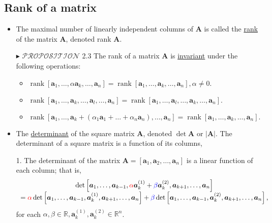 \documentclass[12pt,thmsa]{article}
\begin{document}
\subsection{Rank of a matrix}
\begin{itemize}
	\item The maximal number of linearly independent columns of \(\boldsymbol{A}\) is called the \underline{rank} of the matrix \(\boldsymbol{A}\), denoted rank \(\boldsymbol{A}\).
	
	\item[\(\blacktriangleright\)] \(\mathscr{PROPOSITION}\) 2.3 The rank of a matrix \(\boldsymbol{A}\) is \underline{invariant} under the following operations:
	
	\begin{itemize}
		\item \(\operatorname{rank}\left[\boldsymbol{a}_{1}, \ldots,  \alpha \boldsymbol{a}_{k}, \ldots, \boldsymbol{a}_{n}\right] = \operatorname{rank}\left[\boldsymbol{a}_{1}, \ldots,  \boldsymbol{a}_{k}, \ldots, \boldsymbol{a}_{n}\right],  \alpha \neq 0.\)
		
		\item \(\operatorname{rank}\left[\boldsymbol{a}_{1}, \ldots, \boldsymbol{a}_{k}, \ldots, \boldsymbol{a}_{l}, \ldots, \boldsymbol{a}_{n}\right] = \operatorname{rank}\left[\boldsymbol{a}_{1}, \ldots,  \boldsymbol{a}_{l}, \ldots, \boldsymbol{a}_{k}, \ldots, \boldsymbol{a}_{n}\right]. \)
		
		\item \(\operatorname{rank}\left[\boldsymbol{a}_{1}, \ldots, \boldsymbol{a}_{k} + (\alpha_{1}\boldsymbol{a}_{1} + \ldots + \alpha_{n}\boldsymbol{a}_{n}), \ldots, \boldsymbol{a}_{n}\right] = \operatorname{rank}\left[\boldsymbol{a}_{1}, \ldots,  \boldsymbol{a}_{k}, \ldots, \boldsymbol{a}_{n}\right].\)
	\end{itemize}
	
	\item The \underline{determinant} of the square matrix \(\mathbf{A}\), denoted \( \det \mathbf{A} \) or \( |\mathbf{A}| \). The determinant of a square matrix is a function of its columns,
	
	1. The determinant of the matrix \( \boldsymbol{A}=\left[\boldsymbol{a}_{1}, \boldsymbol{a}_{2}, \ldots, \boldsymbol{a}_{n}\right]\) is a linear function of each column; that is,
	\[
	\begin{array}{c}
		\operatorname{det}\left[\boldsymbol{a}_{1}, \ldots, \boldsymbol{a}_{k-1}, {\color{red}{\alpha}} \boldsymbol{a}_{k}^{(1)}+ {\color{blue}{\beta}} \boldsymbol{a}_{k}^{(2)}, \boldsymbol{a}_{k+1}, \ldots, \boldsymbol{a}_{n}\right] \\
		={\color{red}{\alpha}} \operatorname{det}\left[\boldsymbol{a}_{1}, \ldots, \boldsymbol{a}_{k-1}, \boldsymbol{a}_{k}^{(1)}, \boldsymbol{a}_{k+1}, \ldots, \boldsymbol{a}_{n}\right] 
		+{\color{blue}{\beta}} \operatorname{det}\left[\boldsymbol{a}_{1}, \ldots, \boldsymbol{a}_{k-1}, \boldsymbol{a}_{k}^{(2)}, \boldsymbol{a}_{k+1}, \ldots, \boldsymbol{a}_{n}\right],
	\end{array}
	\]
	for each \( \alpha, \beta \in \mathbb{R}, \boldsymbol{a}_{k}^{(1)}, \boldsymbol{a}_{k}^{(2)} \in \mathbb{R}^{n} \).
	

\end{itemize}
\end{document}
